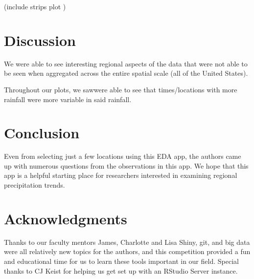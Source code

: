 \documentclass[10pt,letterpaper]{article}
\begin{document}
(include strips plot )


\section*{Discussion}

We were able to see interesting regional aspects of the data that were not able to be seen when aggregated across the entire spatial scale (all of the United States).

Throughout our plots, we sawwere able to see that times/locations with more rainfall were more variable in said rainfall.



\section*{Conclusion}

Even from selecting just a few locations using this EDA app, the authors came up with numerous questions from the observations in this app. We hope that this app is a helpful starting place for researchers interested in examining regional precipitation trends.






\section*{Acknowledgments}

Thanks to our faculty mentors James, Charlotte and Lisa
Shiny, git, and big data were all relatively new topics for the authors, and this competition provided a fun and educational time for us to learn these tools important in our field. Special thanks to CJ Keist for helping us get set up with an RStudio Server instance.



\cite{shiny}

\nolinenumbers

%
%
%

\end{document}
